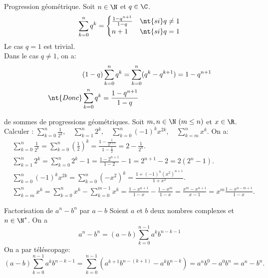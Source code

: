 \documentclass[11pt]{article}
\begin{document}
\begin{prop}{Progression géométrique.}{}
    Soit $n\in\N$ et $q\in\C$.
    \begin{equation*}
        \sum_{k=0}^nq^k=\begin{cases}
            \frac{1-q^{n+1}}{1-q}&\nt{si }q\neq1\\
            n+1&\nt{si }q=1
        \end{cases}
    \end{equation*}
    \tcblower
    Le cas $q=1$ est trivial.\\
    Dans le cas $q\neq 1$, on a:
    \begin{align*}
        &(1-q)\sum_{k=0}^nq^k=\sum_{k=0}^n(q^k-q^{k+1})=1-q^{n+1}\\
        \nt{Donc }&\sum_{k=0}^nq^k=\frac{1-q^{n+1}}{1-q}
    \end{align*}
\end{prop}

\begin{ex}{de sommes de progressions géométriques.}{}
    Soit $m,n\in\N~(m\leq n)$ et $x\in\R$. $\quad$ Calculer : \large$\sum\limits_{k=0}^n\frac{1}{2^k},\quad\sum\limits_{k=1}^n2^k,\quad\sum\limits_{k=0}^n(-1)^kx^{2k},\quad\sum\limits_{k=m}^nx^k$.
    \tcblower
    On a:
    \begin{align*}
        &\sum_{k=0}^n\frac{1}{2^k}=\sum_{k=0}^n\left( \frac{1}{2} \right)^k=\frac{1-\frac{1}{2^{n+1}}}{1-\frac{1}{2}}=2-\frac{1}{2^n}.\\
        &\sum_{k=1}^n2^k=\sum_{k=0}^n2^k-1=\frac{1-2^{n+1}}{1-2}-1=2^{n+1}-2=2(2^n-1).\\
        &\sum_{k=0}^n(-1)^kx^{2k}=\sum_{k=0}^n(-x^2)^k=\frac{1+(-1)^n(x^2)^{n+1}}{1+x^2}.\\
        &\sum_{k=m}^nx^k=\sum_{k=0}^nx^k-\sum_{k=0}^{m-1}x^k=\frac{1-x^{n+1}}{1-x}-\frac{1-x^{m}}{1-x}=\frac{x^m-x^{n+1}}{x-1}=x^m\frac{1-x^{n-m+1}}{1-x}.
    \end{align*}
\end{ex}

\begin{prop}{Factorisation de $a^n-b^n$ par $a-b$}{}
    Soient $a$ et $b$ deux nombres complexes et $n\in\N^*$. On a
    \begin{equation*}
        a^n-b^n=(a-b)\sum_{k=0}^{n-1}a^{k}b^{n-k-1}
    \end{equation*}
    \tcblower
    On a par téléscopage:
    \begin{equation*}
        (a-b)\sum_{k=0}^{n-1}a^{k}b^{n-k-1}=\sum_{k=0}^{n-1}\left( a^{k+1}b^{n-(k+1)}-a^kb^{n-k} \right)=a^nb^0-a^0b^n=a^n-b^n.
    \end{equation*}
\end{prop}
\end{document}
